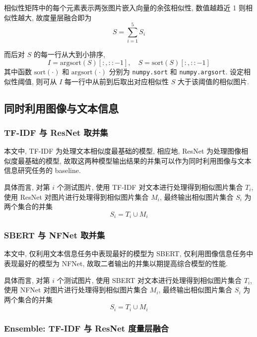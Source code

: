 \documentclass[12pt]{article}
\begin{document}
相似性矩阵中的每个元素表示两张图片嵌入向量的余弦相似性, 数值越趋近 1 则相似性越大, 故度量层融合即为
\begin{equation}
  S = \sum_{i=1}^5S_i
\end{equation}

而后对 $S$ 的每一行从大到小排序, 
\begin{equation}
  I=\text{argsort}(S)[:,::-1],\quad S = \text{sort}(S)[:,::-1]
\end{equation}
其中函数 $\text{sort}(\cdot)$ 和 $\text{argsort}(\cdot)$ 分别为 \verb|numpy.sort| 和 \verb|numpy.argsort|. 设定相似性阈值, 则可从 $I$ 每一行中从前到后取出对应相似性 $S$ 大于该阈值的相似图片.

\subsection{同时利用图像与文本信息}

\subsubsection{TF-IDF 与 ResNet 取并集}

本文中, TF-IDF 为处理文本相似度最基础的模型, 相应地, ResNet 为处理图像相似度最基础的模型, 故取这两种模型输出结果的并集可以作为同时利用图像与文本信息研究任务的 baseline.

具体而言, 对第 $i$ 个测试图片, 使用 TF-IDF 对文本进行处理得到相似图片集合 $T_i$, 使用 ResNet 对图片进行处理得到相似图片集合 $M_i$, 最终输出相似图片集合 $S_i$ 为两个集合的并集
\begin{equation}
  S_i=T_i\cup M_i
\end{equation}

\subsubsection{SBERT 与 NFNet 取并集}

本文中, 仅利用文本信息任务中表现最好的模型为 SBERT, 仅利用图像信息任务中表现最好的模型为 NFNet, 故取二者输出的并集以期提高综合模型的性能.

具体而言, 对第 $i$ 个测试图片, 使用 SBERT 对文本进行处理得到相似图片集合 $T_i$, 使用 NFNet 对图片进行处理得到相似图片集合 $M_i$, 最终输出相似图片集合 $S_i$ 为两个集合的并集
\begin{equation}
  S_i=T_i\cup M_i
\end{equation}

\subsubsection{Ensemble: TF-IDF 与 ResNet 度量层融合}
\end{document}
